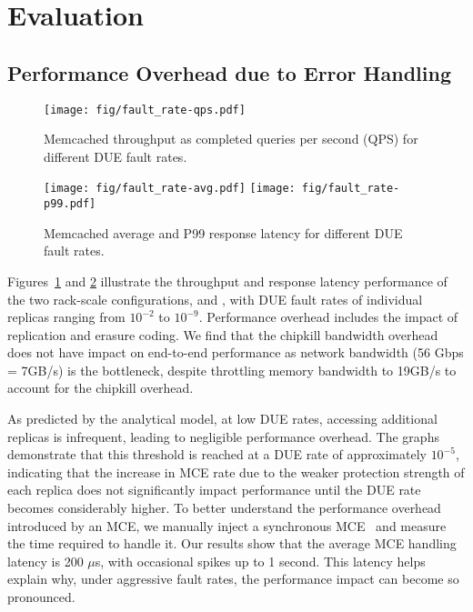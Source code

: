 \section{Evaluation}

\subsection{Performance Overhead due to Error Handling}

\begin{figure}[tb]
\centering
\texttt{[image: fig/fault\_rate-qps.pdf]}
\caption{Memcached throughput as completed queries per second (QPS) for different DUE fault rates.}
\label{fig:throughput-with-failures}
\end{figure}

\begin{figure}[tb]
\centering
\texttt{[image: fig/fault\_rate-avg.pdf]}
\texttt{[image: fig/fault\_rate-p99.pdf]}
\caption{Memcached average and P99 response latency for different DUE fault rates.}
\label{fig:latency-with-failures}
\end{figure}

Figures~\ref{fig:throughput-with-failures} and \ref{fig:latency-with-failures} illustrate the throughput and response latency performance of the two rack-scale configurations, \chipkillrep and \chipkillec, with DUE fault rates of individual replicas ranging from $10^{-2}$ to $10^{-9}$. 
Performance overhead includes the impact of replication and erasure coding.
We find that the chipkill bandwidth overhead does not have impact on end-to-end performance as network bandwidth (56 Gbps = 7GB/s) is the bottleneck, despite throttling memory bandwidth to 19GB/s to account for the chipkill overhead.

As predicted by the analytical model, at low DUE rates, accessing additional replicas is infrequent, leading to negligible performance overhead. The graphs demonstrate that this threshold is reached at a DUE rate of approximately $10^{-5}$, indicating that the increase in MCE rate due to the weaker protection strength of each replica does not significantly impact performance until the DUE rate becomes considerably higher. 
To better understand the performance overhead introduced by an MCE, we manually inject a synchronous MCE~\cite{linux:einj:2024} and measure the time required to handle it. Our results show that the average MCE handling latency is 200 $\mu$s, with occasional spikes up to 1 second. This latency helps explain why, under aggressive fault rates, the performance impact can become so pronounced.

